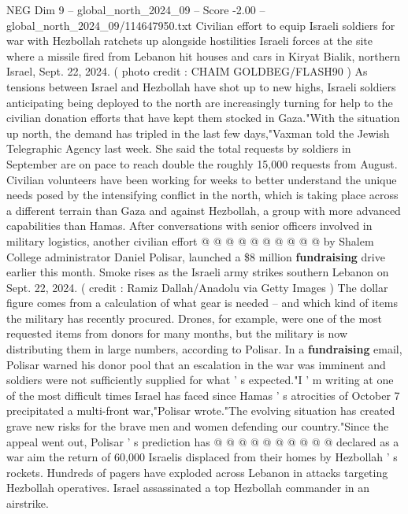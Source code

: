 \begin{textsample}{NEG Dim 9 – global\_north\_2024\_09 – Score -2.00 – global\_north\_2024\_09/114647950.txt}  \label{ex:f9_neg_214}
Civilian effort to equip Israeli soldiers for war with Hezbollah ratchets up alongside hostilities Israeli forces at the site where a missile fired from Lebanon hit houses and cars in Kiryat Bialik, northern Israel, Sept. 22, 2024. ( photo credit : CHAIM GOLDBEG/FLASH90 ) As tensions between Israel and Hezbollah have shot up to new highs, Israeli soldiers anticipating being deployed to the north are increasingly turning for help to the civilian donation efforts that have kept them stocked in Gaza."With the situation up north, the demand has tripled in the last few days,"Vaxman told the Jewish Telegraphic Agency last week.
She said the total requests by soldiers in September are on pace to reach double the roughly 15,000 requests from August.
Civilian volunteers have been working for weeks to better understand the unique needs posed by the intensifying conflict in the north, which is taking place across a different terrain than Gaza and against Hezbollah, a group with more advanced capabilities than Hamas.
After conversations with senior officers involved in military logistics, another civilian effort @ @ @ @ @ @ @ @ @ @ by Shalem College administrator Daniel Polisar, launched a \$8 million \textbf{fundraising} drive earlier this month.
Smoke rises as the Israeli army strikes southern Lebanon on Sept. 22, 2024. ( credit : Ramiz Dallah/Anadolu via Getty Images ) The dollar figure comes from a calculation of what gear is needed -- and which kind of items the military has recently procured.
Drones, for example, were one of the most requested items from donors for many months, but the military is now distributing them in large numbers, according to Polisar.
In a \textbf{fundraising} email, Polisar warned his donor pool that an escalation in the war was imminent and soldiers were not sufficiently supplied for what ' s expected."I ' m writing at one of the most difficult times Israel has faced since Hamas ' s atrocities of October 7 precipitated a multi-front war,"Polisar wrote."The evolving situation has created grave new risks for the brave men and women defending our country."Since the appeal went out, Polisar ' s prediction has @ @ @ @ @ @ @ @ @ @ declared as a war aim the return of 60,000 Israelis displaced from their homes by Hezbollah ' s rockets.
Hundreds of pagers have exploded across Lebanon in attacks targeting Hezbollah operatives.
Israel assassinated a top Hezbollah commander in an airstrike.

\end{textsample}
